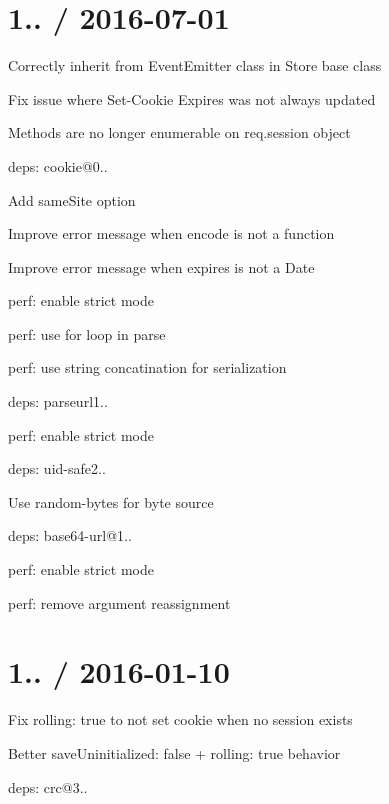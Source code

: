 \section*{1.. / 2016-\/07-\/01 }


\begin{DoxyItemize}
\item Correctly inherit from {\ttfamily Event\+Emitter} class in {\ttfamily Store} base class
\item Fix issue where {\ttfamily Set-\/\+Cookie} {\ttfamily Expires} was not always updated
\item Methods are no longer enumerable on {\ttfamily req.\+session} object
\item deps\+: cookie@0..
\begin{DoxyItemize}
\item Add {\ttfamily same\+Site} option
\item Improve error message when {\ttfamily encode} is not a function
\item Improve error message when {\ttfamily expires} is not a {\ttfamily Date}
\item perf\+: enable strict mode
\item perf\+: use for loop in parse
\item perf\+: use string concatination for serialization
\end{DoxyItemize}
\item deps\+: parseurl1..
\begin{DoxyItemize}
\item perf\+: enable strict mode
\end{DoxyItemize}
\item deps\+: uid-\/safe2..
\begin{DoxyItemize}
\item Use {\ttfamily random-\/bytes} for byte source
\item deps\+: base64-\/url@1..
\end{DoxyItemize}
\item perf\+: enable strict mode
\item perf\+: remove argument reassignment
\end{DoxyItemize}

\section*{1.. / 2016-\/01-\/10 }


\begin{DoxyItemize}
\item Fix {\ttfamily rolling\+: true} to not set cookie when no session exists
\begin{DoxyItemize}
\item Better {\ttfamily save\+Uninitialized\+: false} + {\ttfamily rolling\+: true} behavior
\end{DoxyItemize}
\item deps\+: crc@3..
\end{DoxyItemize}

